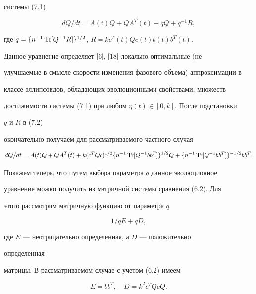 системы (7.1) 


\begin{equation} 


d Q/d t=A(t)Q+Q A^T(t)+q Q+q^{-1}R, 


\end{equation} 


где $q=\{n^{-1}\operatorname{Tr}[Q^{-1}R]\}^{1/2}$, $R=k c^T(t)Q c(t)b(t)b^T(t)$. 


Данное уравнение определяет [6], [18] локально оптимальные (не 


улучшаемые в смысле скорости изменения фазового объема) аппроксимации в 


классе эллипсоидов, обладающих эволюционными свойствами, множеств 


достижимости системы (7.1) при любом $\eta(t)\in[0,k]$. После подстановки 


$q$ и $R$ в (7.2) 


окончательно получаем для рассматриваемого частного случая 


\begin{equation} 


d Q/d t=A(t)Q +Q A^T(t)+k(c^T Q c)^{1/2}\{n^{-1}\Tr[Q^{-1} 


b b^T]\}^{1/2}Q+\{n^{-1}\Tr[Q^{-1}b b^T]\}^{-1/2}b b^T. 


\end{equation} 


 


Покажем теперь, что путем выбора параметра $q$ данное эволюционное 


уравнение можно получить из матричной системы сравнения (6.2). Для 


этого рассмотрим матричную функцию от параметра $q$ 


\begin{equation} 


1/q E+q D, 


\end{equation} 


где $E$ --- неотрицательно определенная, а $D$ --- положительно 


определенная 


матрицы. В рассматриваемом случае с учетом (6.2) имеем 


\begin{equation} 


E=b b^T,\quad D=k^2c^T Q c Q. 


\end{equation} 


